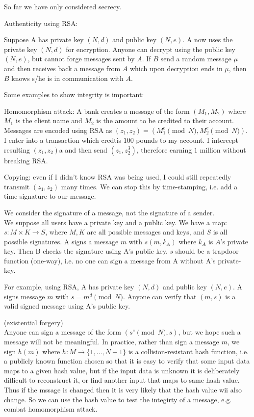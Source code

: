 \documentclass[a4paper]{article}
\begin{document}
So far we have only considered secrecy.

Authenticity using RSA:

Suppose A has private key $(N,d)$ and public key $(N,e)$. A now uses the private key $(N,d)$ for encryption. Anyone can decrypt using the public key $(N,e)$, but cannot forge messages sent by $A$. If $B$ send a random message $\mu$ and then receives back a message from $A$ which upon decryption ends in $\mu$, then $B$ knows s/he is in communication with $A$.

Some examples to show integrity is important:

Homomorphism attack: A bank creates a message of the form $(M_1,M_2)$ where $M_1$ is the client name and $M_2$ is the amount to be credited to their account. Messages are encoded using RSA as $(z_1,z_2) = (M_1^e \pmod N, M_2^e \pmod N)$. I enter into a transaction which credtis $100$ pounds to my account. I intercept resulting $(z_1,z_2)$a and then send $(z_1,z_2^3)$, therefore earning $1$ million without breaking RSA.

Copying: even if I didn't know RSA was being used, I could still repeatedly transmit $(z_1,z_2)$ many times. We can stop this by time-stamping, i.e. add a time-signature to our message.

\begin{rem}
We consider the signature of a message, not the signature of a sender.\\
We suppose all users have a private key and a public key. We have a map: $s: M \times K \to S$, where $M,K$ are all possible messages and keys, and $S$ is all possible signatures. A signs a message $m$ with $s(m,k_A)$ where $k_A$ is $A$'s private key. Then B checks the signature using A's public key. $s$ should be a trapdoor function (one-way), i.e. no one can sign a message from A without A's private-key.
\end{rem}

For example, using RSA, A has private key $(N,d)$ and public key $(N,e)$. A signs message $m$ with $s=m^d \pmod N$. Anyone can verify that $(m,s)$ is a valid signed message using A's public key.

\begin{rem} (existential forgery)\\
Anyone can sign a message of the form $(s^e \pmod N, s)$, but we hope such a message will not be meaningful. In practice, rather than sign a message $m$, we sign $h(m)$ where $h:M \to \{1,...,N-1\}$ is a collision-resistant hash function, i.e. a publicly known function chosen so that it is easy to verify that some input data maps to a given hash value, but if the input data is unknown  it is deliberately difficult to reconstruct it, or find another input that maps to same hash value.\\
Thus if the mssage is changed then it is very likely that the hash value wii also change. So we can use the hash value to test the integirty of a message, e.g. combat homomorphism attack.
\end{rem}
\end{document}
